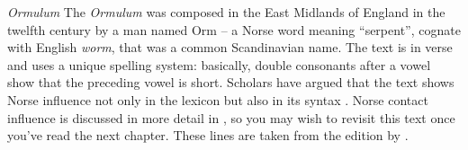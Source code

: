 \newpage
\largerpage
\begin{texts}{\textit{Ormulum}}
The \textit{Ormulum} was composed in the East Midlands of England in the twelfth century by a man named Orm -- a Norse word meaning ``serpent'', cognate with English \textit{worm}, that was a common Scandinavian name. The text is in verse and uses a unique spelling system: basically, double consonants after a vowel show that the preceding vowel is short. Scholars have argued that the text shows Norse influence not only in the lexicon but also in its syntax \citep{Trips2002}. Norse contact influence is discussed in more detail in , so you may wish to revisit this text once you've read the next chapter. These lines are taken from the edition by \citet{White1878}.




\end{texts}
